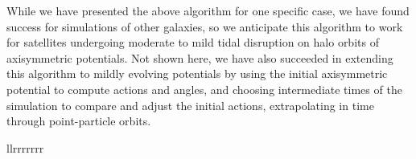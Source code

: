 \documentclass[linenumbers, twocolumn, twocolappendix]{aastex701}
\begin{document}
While we have presented the above algorithm for one specific case, we have found success for simulations of other galaxies, so we anticipate this algorithm to work for satellites undergoing moderate to mild tidal disruption on halo orbits of axisymmetric potentials. Not shown here, we have also succeeded in extending this algorithm to mildly evolving potentials by using the initial axisymmetric potential to compute actions and angles, and choosing intermediate times of the simulation to compare and adjust the initial actions, extrapolating in time through point-particle orbits. 



\begin{deluxetable*}{llrrrrrrr}


\end{deluxetable*}
\end{document}
